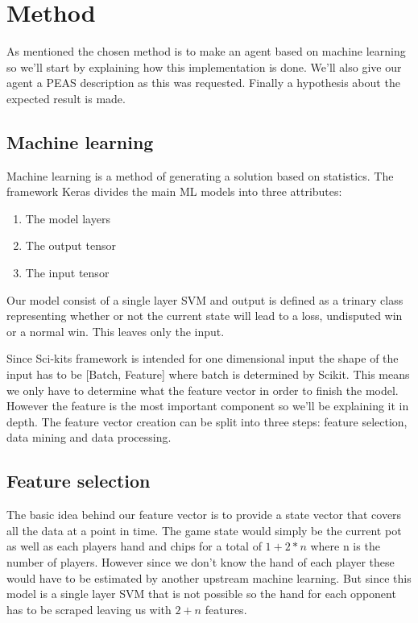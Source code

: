 \documentclass[../main.tex]{subfiles}
\begin{document}
\section{Method}
As mentioned the chosen method is to make an agent based on machine learning so we'll start by explaining how this implementation is done. We'll also give our agent a PEAS description as this was requested. Finally a hypothesis about the expected result is made.

\subsection{Machine learning}
Machine learning is a method of generating a solution based on statistics. The framework Keras divides the main ML models into three attributes: 
\begin{enumerate}
    \item The model layers 
    \item The output tensor
    \item The input tensor
\end{enumerate}

Our model consist of a single layer SVM and output is defined as a trinary class representing whether or not the current state will lead to a loss, undisputed win or a normal win. This leaves only the input.

Since Sci-kits framework is intended for one dimensional input the shape of the input has to be [Batch, Feature] where batch is determined by Scikit. This means we only have to determine what the feature vector in order to finish the model. However the feature is the most important component so we'll be explaining it in depth. The feature vector creation can be split into three steps: feature selection, data mining and data processing.

\subsection{Feature selection}
The basic idea behind our feature vector is to provide a state vector that covers all the data at a point in time. The game state would simply be the current pot as well as each players hand and chips for a total of $1+2*n$ where n is the number of players. However since we don't know the hand of each player these would have to be estimated by another upstream machine learning. But since this model is a single layer SVM that is not possible so the hand for each opponent has to be scraped leaving us with $2+n$ features.
\end{document}
